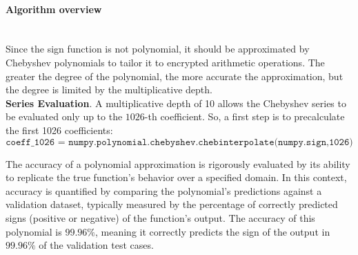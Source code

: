 \documentclass[article]{iacrtrans}
\newcommand{\andreea}[1]{{\color{blue} [Andreea: #1]}}
\newcommand{\daria}[1]{{\color{violet} [Daria: #1]}}
\begin{document}
\paragraph{Algorithm overview}\mbox{}\\

Since the sign function is not polynomial, it should be approximated by Chebyshev polynomials to tailor it to encrypted arithmetic operations. The greater the degree of the polynomial, the more accurate the approximation, but the degree is limited by the multiplicative depth.\\


\textbf{Series Evaluation}. A multiplicative depth of 10 allows the Chebyshev series to be evaluated only up to the $1026$-th coefficient. So, a first step is to precalculate the first 1026 coefficients:
\[ \texttt{coeff\_1026 = numpy.polynomial.chebyshev.chebinterpolate(numpy.sign,1026)} \]

The accuracy of a polynomial approximation is rigorously evaluated by its ability to replicate the true function’s behavior over a specified domain. 
In this context, accuracy is quantified by comparing the polynomial's predictions against a validation dataset, typically measured by the percentage of correctly predicted signs (positive or negative) of the function's output. The accuracy of this polynomial is $99.96\%$, meaning it correctly predicts the sign of the output in $99.96\%$ of the validation test cases. \\
\end{document}
